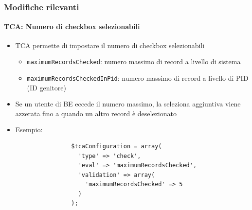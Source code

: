 \begin{frame}[fragile]
	\frametitle{Modifiche rilevanti}
	\framesubtitle{TCA: Numero di checkbox selezionabili}

	\lstset{
		basicstyle=\tiny\ttfamily
	}

	\begin{itemize}
		\item TCA permette di impostare il numero di checkbox selezionabili

			\begin{itemize}
				\item \texttt{maximumRecordsChecked}:\newline
					numero massimo di record a livello di sistema
				\item \texttt{maximumRecordsCheckedInPid}:\newline
					numero massimo di record a livello di PID (ID genitore)
			\end{itemize}

		\item Se un utente di BE eccede il numero massimo, la seleziona aggiuntiva viene azzerata fino a quando un altro record è deselezionato

		\item Esempio:

			\begin{lstlisting}
				$tcaConfiguration = array(
				  'type' => 'check',
				  'eval' => 'maximumRecordsChecked',
				  'validation' => array(
				    'maximumRecordsChecked' => 5
				  )
				);
			\end{lstlisting}

	\end{itemize}

\end{frame}


